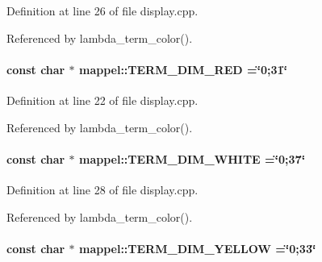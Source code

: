 Definition at line 26 of file display.\+cpp.



Referenced by lambda\+\_\+term\+\_\+color().

\paragraph[{\texorpdfstring{T\+E\+R\+M\+\_\+\+D\+I\+M\+\_\+\+R\+ED}{TERM_DIM_RED}}]{\setlength{\rightskip}{0pt plus 5cm}const char $\ast$ mappel\+::\+T\+E\+R\+M\+\_\+\+D\+I\+M\+\_\+\+R\+ED =\char`\"{}0;31\char`\"{}}\hypertarget{namespacemappel_ad0396f6c4c69571a8d774588bfd6a1bd}{}\label{namespacemappel_ad0396f6c4c69571a8d774588bfd6a1bd}


Definition at line 22 of file display.\+cpp.



Referenced by lambda\+\_\+term\+\_\+color().

\paragraph[{\texorpdfstring{T\+E\+R\+M\+\_\+\+D\+I\+M\+\_\+\+W\+H\+I\+TE}{TERM_DIM_WHITE}}]{\setlength{\rightskip}{0pt plus 5cm}const char $\ast$ mappel\+::\+T\+E\+R\+M\+\_\+\+D\+I\+M\+\_\+\+W\+H\+I\+TE =\char`\"{}0;37\char`\"{}}\hypertarget{namespacemappel_a15d16c02d9b595b272213768978e691b}{}\label{namespacemappel_a15d16c02d9b595b272213768978e691b}


Definition at line 28 of file display.\+cpp.



Referenced by lambda\+\_\+term\+\_\+color().

\paragraph[{\texorpdfstring{T\+E\+R\+M\+\_\+\+D\+I\+M\+\_\+\+Y\+E\+L\+L\+OW}{TERM_DIM_YELLOW}}]{\setlength{\rightskip}{0pt plus 5cm}const char $\ast$ mappel\+::\+T\+E\+R\+M\+\_\+\+D\+I\+M\+\_\+\+Y\+E\+L\+L\+OW =\char`\"{}0;33\char`\"{}}\hypertarget{namespacemappel_af34f15f5200f5711a39b0dd715907f61}{}\label{namespacemappel_af34f15f5200f5711a39b0dd715907f61}


